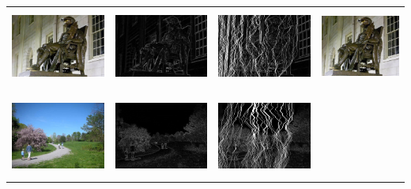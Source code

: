 \documentclass[a4paper]{article}
\begin{document}
  \begin{center}
  \begin{tabular}{cccc}
  \includegraphics[height=2.5cm]{results_seamcarving/1/image_input.png} &
  \includegraphics[height=2.5cm]{results_seamcarving/1/cost_init.png} &
  \includegraphics[height=2.5cm]{results_seamcarving/1/cost_remove.png} &
  \includegraphics[height=2.5cm]{results_seamcarving/1/image_output.png} \\\\
  \includegraphics[height=2.7cm]{results_seamcarving/2/image_input.png} &
  \includegraphics[height=2.7cm]{results_seamcarving/2/cost_init.png} &
  \includegraphics[height=2.7cm]{results_seamcarving/2/cost_remove.png} &

\end{tabular}
\end{center}
\end{document}
